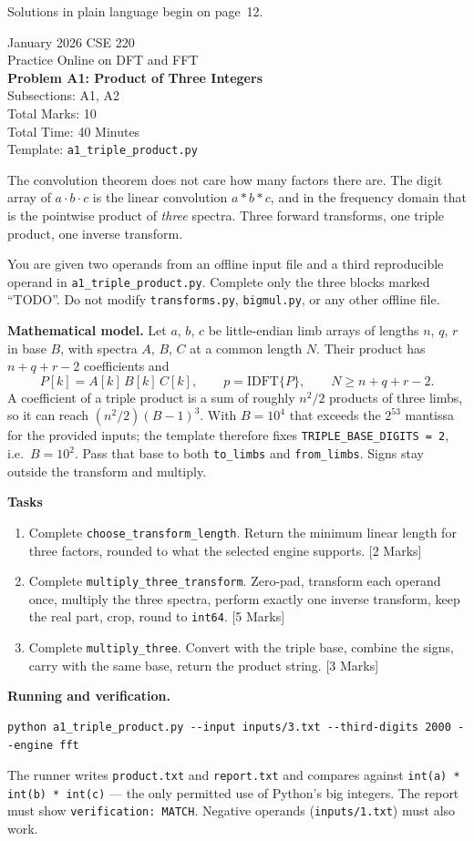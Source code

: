 \documentclass[11pt]{article}
\newcommand{\file}[1]{\texttt{#1}}
\newcommand{\code}[1]{\texttt{#1}}
\newcommand{\problemheader}[3]{%
  \begin{center}
    {\large January 2026 CSE 220}\\
    {\large Practice Online on DFT and FFT}\\[2pt]
    {\Large\bfseries #1}\\[2pt]
    Subsections: #2\\
    Total Marks: 10\\
    Total Time: 40 Minutes\\[2pt]
    {\small Template: \file{#3}}
  \end{center}
  \vspace{4pt}
}
\begin{document}
Solutions in plain language begin on page~12.

\newpage
\problemheader{Problem A1: Product of Three Integers}{A1, A2}{a1\_triple\_product.py}

The convolution theorem does not care how many factors there are. The digit
array of $a \cdot b \cdot c$ is the linear convolution $a * b * c$, and in the
frequency domain that is the pointwise product of \emph{three} spectra. Three
forward transforms, one triple product, one inverse transform.

You are given two operands from an offline input file and a third reproducible
operand in \file{a1\_triple\_product.py}. Complete only the three blocks marked
``TODO''. Do not modify \file{transforms.py}, \file{bigmul.py}, or any other
offline file.

\textbf{Mathematical model.} Let $a$, $b$, $c$ be little-endian limb arrays of
lengths $n$, $q$, $r$ in base $B$, with spectra $A$, $B$, $C$ at a common length
$N$. Their product has $n + q + r - 2$ coefficients and
\[
  P[k] = A[k]\,B[k]\,C[k], \qquad p = \mathrm{IDFT}\{P\}, \qquad N \ge n + q + r - 2 .
\]
A coefficient of a triple product is a sum of roughly $n^2/2$ products of three
limbs, so it can reach $(n^2/2)(B-1)^3$. With $B = 10^4$ that exceeds the
$2^{53}$ mantissa for the provided inputs; the template therefore fixes
\code{TRIPLE\_BASE\_DIGITS = 2}, i.e.\ $B = 10^2$. Pass that base to both
\code{to\_limbs} and \code{from\_limbs}. Signs stay outside the transform and
multiply.

\textbf{Tasks}
\begin{enumerate}[nosep]
  \item Complete \code{choose\_transform\_length}. Return the minimum linear
        length for three factors, rounded to what the selected engine supports.
        \hfill [2 Marks]
  \item Complete \code{multiply\_three\_transform}. Zero-pad, transform each
        operand once, multiply the three spectra, perform exactly one inverse
        transform, keep the real part, crop, round to \code{int64}.
        \hfill [5 Marks]
  \item Complete \code{multiply\_three}. Convert with the triple base, combine
        the signs, carry with the same base, return the product string.
        \hfill [3 Marks]
\end{enumerate}

\textbf{Running and verification.}
\begin{lstlisting}
python a1_triple_product.py --input inputs/3.txt --third-digits 2000 --engine fft
\end{lstlisting}
The runner writes \file{product.txt} and \file{report.txt} and compares against
\code{int(a) * int(b) * int(c)} --- the only permitted use of Python's big
integers. The report must show \code{verification: MATCH}. Negative operands
(\file{inputs/1.txt}) must also work.
\end{document}
